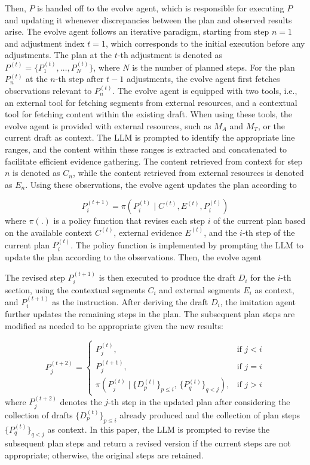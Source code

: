 \documentclass[manuscript,review,anonymous]{acmart}
\begin{document}
Then, $P$ is handed off to the evolve agent, which is responsible for executing $P$ and updating it whenever discrepancies between the plan and observed results arise. The evolve agent follows an iterative paradigm, starting from step $n = 1$ and adjustment index $t = 1$, which corresponds to the initial execution before any adjustments. The plan at the $t$-th adjustment is denoted as $P^{(t)} = \{P_1^{(t)}, \ldots, P_N^{(t)}\}$, where $N$ is the number of planned steps. For the plan $P_n^{(t)}$ at the $n$-th step after $t-1$ adjustments, the evolve agent first fetches observations relevant to $P_n^{(t)}$. The evolve agent is equipped with two tools, i.e., an external tool for fetching segments from external resources, and a contextual tool for fetching content within the existing draft. When using these tools, the evolve agent is provided with external resources, such as $M_A$ and $M_T$, or the current draft as context. The LLM is prompted to identify the appropriate line ranges, and the content within these ranges is extracted and concatenated to facilitate efficient evidence gathering. The content retrieved from context for step $n$ is denoted as $C_n$, while the content retrieved from external resources is denoted as $E_n$. Using these observations, the evolve agent updates the plan according to

\begin{equation}
P_i^{(t+1)} = \pi(P_i^{(t)} \mid C^{(t)}, E^{(t)}, P_i^{(t)})
\end{equation}
where $\pi(.)$ is a policy function that revises each step $i$ of the current plan based on the available context $C^{(t)}$, external evidence $E^{(t)}$, and the $i$-th step of the current plan $P_i^{(t)}$. The policy function is implemented by prompting the LLM to update the plan according to the observations. Then, the evolve agent 

The revised step $P_i^{(t+1)}$ is then executed to produce the draft $D_i$ for the $i$-th section, using the contextual segments $C_i$ and external segments $E_i$ as context, and $P_i^{(t+1)}$ as the instruction. After deriving the draft $D_i$, the imitation agent further updates the remaining steps in the plan. The subsequent plan steps are modified as needed to be appropriate given the new results:

\begin{equation}
P_j^{(t+2)} = 
\begin{cases}
P_j^{(t)}, & \text{if } j < i \\
P_j^{(t+1)}, & \text{if } j = i \\
\pi\left(P_j^{(t)} \mid \{D_p^{(t)}\}_{p \leq i},\, \{P_q^{(t)}\}_{q < j}\right), & \text{if } j > i
\end{cases}
\end{equation}
where $P_j^{(t+2)}$ denotes the $j$-th step in the updated plan after considering the collection of drafts $\{D^{(t)}_p\}_{p \leq i}$ already produced and the collection of plan steps $\{P_q^{(t)}\}_{q < j}$ as context. In this paper, the LLM is prompted to revise the subsequent plan steps and return a revised version if the current steps are not appropriate; otherwise, the original steps are retained.
\end{document}
